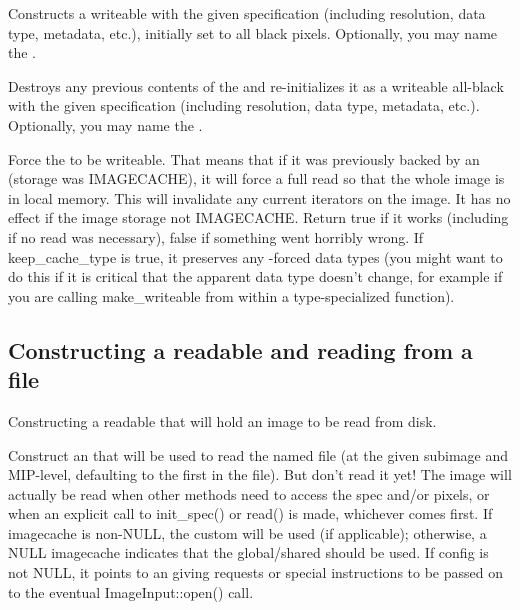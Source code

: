 Constructs a writeable \ImageBuf with the given specification (including
resolution, data type, metadata, etc.), initially set to all black pixels.
Optionally, you may name the \ImageBuf.
\apiend

Destroys any previous contents of the \ImageBuf and re-initializes it
as a writeable all-black \ImageBuf with the given specification (including
resolution, data type, metadata, etc.).  Optionally, you may name the
\ImageBuf.
\apiend

Force the \ImageBuf to be writeable. That means that if it was previously
backed by an \ImageCache (storage was {\cf IMAGECACHE}), it will force a
full read so that the whole image is in local memory.
This will invalidate any current iterators on the image. It has
no effect if the image storage not {\cf IMAGECACHE}.  Return {\cf true} if
it works (including if no read was necessary), {\cf false} if something went
horribly wrong. If {\cf keep_cache_type} is true, it preserves any
\ImageCache-forced data types (you might want to do this if it is critical
that the apparent data type doesn't change, for example if you are calling
make_writeable from within a type-specialized function).
\apiend

\subsection*{Constructing a readable \ImageBuf and reading from a file}

Constructing a readable \ImageBuf that will hold an image to be read
from disk.

Construct an \ImageBuf that will be used to read the named file (at the
given subimage and MIP-level, defaulting to the first in the file).  But
don't read it yet!  The image will actually be read when other methods
need to access the spec and/or pixels, or when an explicit call to
{\cf init_spec()} or {\cf read()} is made, whichever comes first. 
If {\cf imagecache} is non-NULL, the custom
\ImageCache will be used (if applicable); otherwise, a NULL imagecache
indicates that the global/shared \ImageCache should be used.
If {\cf config} is not NULL, it points to an \ImageSpec giving requests
or special instructions to be passed on to the eventual
{\cf ImageInput::open()} call.
\apiend


